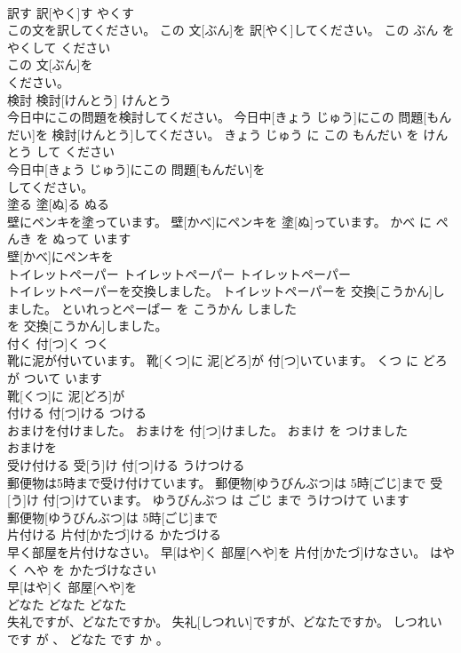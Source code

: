 \documentclass[8pt]{extreport}
\begin{document}
\begin{CJK}{UTF8}{min}
\\	訳す	訳[やく]す	やくす	
\\	この文を訳してください。	この 文[ぶん]を 訳[やく]してください。	この ぶん を やくして ください	
\\	この 文[ぶん]を
\\	ください。		
\\	検討	検討[けんとう]	けんとう	
\\	今日中にこの問題を検討してください。	今日中[きょう じゅう]にこの 問題[もんだい]を 検討[けんとう]してください。	きょう じゅう に この もんだい を けんとう して ください	
\\	今日中[きょう じゅう]にこの 問題[もんだい]を
\\	してください。		
\\	塗る	塗[ぬ]る	ぬる	
\\	壁にペンキを塗っています。	壁[かべ]にペンキを 塗[ぬ]っています。	かべ に ぺんき を ぬって います	
\\	壁[かべ]にペンキを
\\	トイレットペーパー	トイレットペーパー	トイレットペーパー	
\\	トイレットペーパーを交換しました。	トイレットペーパーを 交換[こうかん]しました。	といれっとぺーぱー を こうかん しました	
\\	を 交換[こうかん]しました。		
\\	付く	付[つ]く	つく	
\\	靴に泥が付いています。	靴[くつ]に 泥[どろ]が 付[つ]いています。	くつ に どろ が ついて います	
\\	靴[くつ]に 泥[どろ]が
\\	付ける	付[つ]ける	つける	
\\	おまけを付けました。	おまけを 付[つ]けました。	おまけ を つけました	
\\	おまけを
\\	受け付ける	受[う]け 付[つ]ける	うけつける	
\\	郵便物は5時まで受け付けています。	郵便物[ゆうびんぶつ]は 5時[ごじ]まで 受[う]け 付[つ]けています。	ゆうびんぶつ は ごじ まで うけつけて います	
\\	郵便物[ゆうびんぶつ]は 5時[ごじ]まで
\\	片付ける	片付[かたづ]ける	かたづける	
\\	早く部屋を片付けなさい。	早[はや]く 部屋[へや]を 片付[かたづ]けなさい。	はやく へや を かたづけなさい	
\\	早[はや]く 部屋[へや]を
\\	どなた	どなた	どなた	
\\	失礼ですが、どなたですか。	失礼[しつれい]ですが、どなたですか。	しつれい です が 、 どなた です か 。	

\end{CJK}
\end{document}
